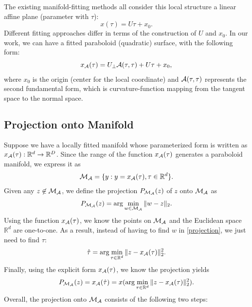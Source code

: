\documentclass{article}
\theoremstyle{remark}
\begin{document}
The existing manifold-fitting methods all consider this local structure a linear affine plane (parameter with $\tau$):
\[
 x(\tau)  =  U \tau +x_0.
\]
Different fitting approaches differ in terms of the construction of $U$ and $x_0$.
In our work, we can have a fitted paraboloid (quadratic) surface, with the following form:
\begin{equation}\label{manifold_representation}
x_{\cal A}(\tau) = U_{\perp} {\cal A} (\tau,\tau) + U \tau +x_0,
\end{equation}
where $x_0$ is the origin (center for the local coordinate) and ${\cal A} (\tau,\tau)$ represents the second fundamental form, which is curvature-function mapping from the tangent space to the normal space. 

\subsection{Projection onto Manifold}
Suppose we have a locally fitted manifold whose parameterized form is written as $x_{\cal A}(\tau): {\mathbb R}^d\rightarrow {\mathbb R}^D$.
Since the range of the function $x_{\cal A}(\tau)$ generates a paraboloid manifold, we express it as 
\[
{\cal M}_{\cal A} = \{y: y = x_{\cal A}(\tau), \tau\in {\mathbb R}^d\}.
\]
Given any $z\not\in{\cal M}_{\cal A}$, we define the projection $P_{{\cal M}_{\cal A}}(z)$  of $z$ onto ${\cal M}_{\cal A}$ as
\begin{equation}\label{projection}
P_{{\cal M}_{\cal A}}(z) = \arg\min_{w \in {\cal M}_{\cal A} }\|w-z\|_2.
\end{equation}
Using the function $x_{\cal A}(\tau)$, we know the points on ${\cal M}_{\cal A}$ and the Euclidean space ${\mathbb R}^d$ are one-to-one. As a result, instead of having to find $w$ in \eqref{projection}, we just need to find $\tau$:
\begin{equation}\label{projection_tau}
 \hat{\tau} = \arg\min_{\tau\in {\mathbb R}^d }\|z-x_{\cal A}(\tau)\|_2^2.
\end{equation}
Finally, using the explicit form $x_{\cal A}(\tau)$, we know the projection yields
\[
P_{{\cal M}_{\cal A}}(z) = x_{\cal A}(\hat{\tau})=x(\arg\min_{\tau\in {\mathbb R}^d }\|z-x_{\cal A}(\tau)\|_2^2).
\]
Overall, the projection onto ${\cal M}_{\cal A}$ consists of the following two steps:
\end{document}
